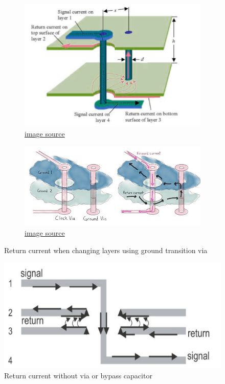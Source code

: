 \documentclass[final]{cubedoc}
\begin{document}
	\begin{figure}[h!]
		\centering
		\begin{subfigure}{.4\textwidth}
			\centering
			\includegraphics[keepaspectratio, height=0.3\textheight, width=\textwidth]{assets/change_layer.png}
			\caption{\href{https://web.archive.org/web/20200814093652/http://www.sigcon.com/Pubs/news/6_04.htm}{image source}}
		\end{subfigure}
		\begin{subfigure}{.4\textwidth}
			\centering
			\includegraphics[keepaspectratio, height=0.3\textheight, width=\textwidth]{assets/ground_trans.png}
			\caption{\href{https://web.archive.org/web/20200814093921/https://www.tempoautomation.com/blog/design-to-avoid-emi-problems-keep-clocks-away-from-unintended-antennas/}{image source}}
		\end{subfigure}
		\caption{Return current when changing layers using ground transition via}
	\end{figure}
	
	\begin{figure}[h!]
		\centering
		\includegraphics[width=.7\textwidth, height=.2\textheight]{assets/change_layer2.png}
		\caption{Return current without via or bypass capacitor \cite{bogatin2009signal}}
	\end{figure}
	
\end{document}
